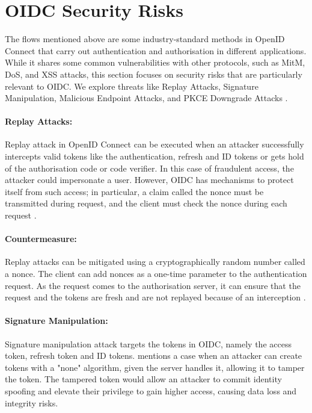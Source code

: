 \section{OIDC Security Risks}

The flows mentioned above are some industry-standard methods in OpenID Connect that carry out authentication and authorisation in different applications.
While it shares some common vulnerabilities with other protocols, such as MitM, DoS, and XSS attacks, this section focuses on security risks that are particularly relevant to OIDC.
We explore threats like Replay Attacks, Signature Manipulation, Malicious Endpoint Attacks, and PKCE Downgrade Attacks \citep{oidc_attacks}. 

    \paragraph{Replay Attacks:} Replay attack in OpenID Connect can be executed when an attacker successfully intercepts valid tokens like the authentication, refresh and ID tokens or gets hold of the authorisation code or code verifier. In this case of fraudulent access, the attacker could impersonate a user. However, OIDC has mechanisms to protect itself from such access; in particular, a claim called the nonce must be transmitted during request, and the client must check the nonce during each request \citep{oidc_attacks}. 

    \paragraph{Countermeasure:} Replay attacks can be mitigated using a cryptographically random number called a nonce. The client can add nonces as a one-time parameter to the authentication request. As the request comes to the authorisation server, it can ensure that the request and the tokens are fresh and are not replayed because of an interception \citep{oidc_attacks}.
    
    \paragraph{Signature Manipulation:} Signature manipulation attack targets the tokens in OIDC, namely the access token, refresh token and ID tokens. \cite{oidc_attacks} mentions a case when an attacker can create tokens with a "none" algorithm, given the server handles it, allowing it to tamper the token. The tampered token would allow an attacker to commit identity spoofing and elevate their privilege to gain higher access, causing data loss and integrity risks.

